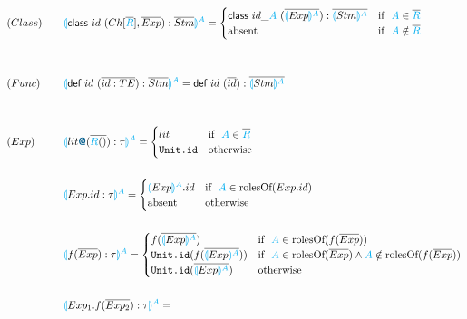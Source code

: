 \documentclass{thesis}
\newcommand{\projection}[2]{{\color{cyan}\llparenthesis}#1{\color{cyan}\rrparenthesis^#2}}
\newcommand{\mblue}[1]{\textbf{\textsf{\color{MidnightBlue}#1}}}
\newcommand{\cyan}[1]{\color{cyan}#1}
\begin{document}
\begin{alignat*}{2}
  &(Class)~~~ &&\projection{\textsf{class} ~id~(Ch[\overline{\cyan{R}}],\overline{Exp}):\overline{Stm}}{A}=
  \begin{cases}
    \textsf{class} ~id\_{\cyan{A}}~(\overline{\projection{Exp}{A}}):\overline{\projection{Stm}{A}} & \text{if}~~ {\cyan{A}} \in \overline{\cyan{R}}\\
    \text{absent} & \text{if}~~ {\cyan{A}} \notin \overline{\cyan{R}}
  \end{cases}\\
  \\
  \\
  &(Func)~~~ &&\projection{\textsf{def} ~id~(\overline{id:TE}):\overline{Stm}}{A} = \textsf{def} ~id~ (\overline{id}):\overline{\projection{Stm}{A}}\\
  \\
  \\
  &(Exp)~~~ &&\projection{lit\mblue{@}(\overline{{\color{cyan}{R}}()}):\tau}{A}=
  \begin{cases}
    lit & \text{if}~~ {\color{cyan}A} \in \overline{\color{cyan}{R}}\\
    \texttt{Unit.id} &\text{otherwise}
  \end{cases}\\
  \\
  &&&\projection{Exp.id:\tau}{A}=
  \begin{cases}
    \projection{Exp}{A}.id &\text{if}~~{\color{cyan}A} \in \text{rolesOf} (Exp.id)\\
    \text{absent} &\text{otherwise}
  \end{cases}\\
  \\
  &&&\projection{f(\overline{Exp}):\tau}{A} =
  \begin{cases}
    f(\overline{\projection{Exp}{A}}) &\text{if}~~ {\color{cyan}A} \in \text{rolesOf} (f(\overline{Exp}))\\
    \texttt{Unit.id}(f(\overline{\projection{Exp}{A}})) &\text{if}~~ {\color{cyan}A} \in \text{rolesOf}(\overline{Exp}) \wedge {\color{cyan}A} \notin \text{rolesOf} (f(\overline{Exp}))\\
    \texttt{Unit.id}(\overline{\projection{Exp}{A}}) &\text{otherwise}
  \end{cases}\\
  \\
  &&&\projection{Exp_1.f(\overline{Exp_2}):\tau}{A}=

\end{alignat*}
\end{document}
